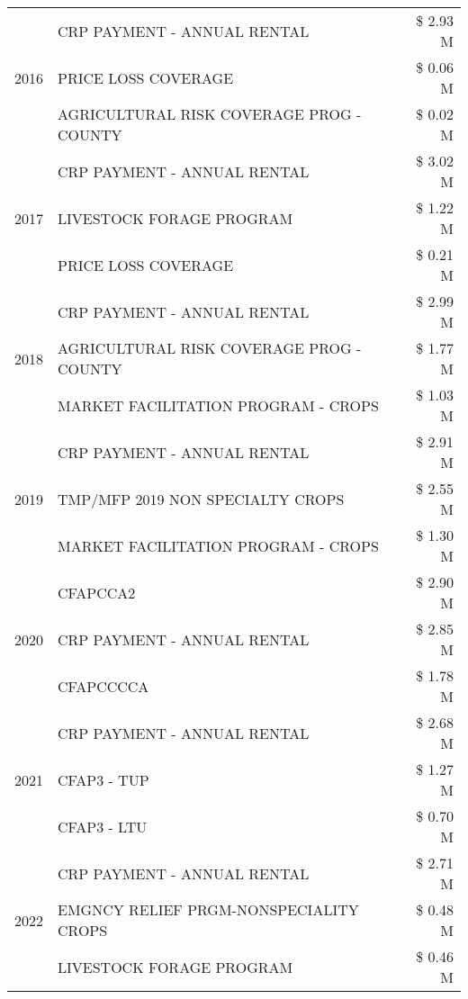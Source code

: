 \begin{tabular}{llr}
\cline{1-3}
\multirow[t]{3}{*}{2016} & CRP PAYMENT - ANNUAL RENTAL & \$ 2.93 M \\
 & PRICE LOSS COVERAGE & \$ 0.06 M \\
 & AGRICULTURAL RISK COVERAGE PROG - COUNTY & \$ 0.02 M \\
\cline{1-3}
\multirow[t]{3}{*}{2017} & CRP PAYMENT - ANNUAL RENTAL & \$ 3.02 M \\
 & LIVESTOCK FORAGE PROGRAM & \$ 1.22 M \\
 & PRICE LOSS COVERAGE & \$ 0.21 M \\
\cline{1-3}
\multirow[t]{3}{*}{2018} & CRP PAYMENT - ANNUAL RENTAL & \$ 2.99 M \\
 & AGRICULTURAL RISK COVERAGE PROG - COUNTY & \$ 1.77 M \\
 & MARKET FACILITATION PROGRAM - CROPS & \$ 1.03 M \\
\cline{1-3}
\multirow[t]{3}{*}{2019} & CRP PAYMENT - ANNUAL RENTAL & \$ 2.91 M \\
 & TMP/MFP 2019 NON SPECIALTY CROPS & \$ 2.55 M \\
 & MARKET FACILITATION PROGRAM - CROPS & \$ 1.30 M \\
\cline{1-3}
\multirow[t]{3}{*}{2020} & CFAPCCA2 & \$ 2.90 M \\
 & CRP PAYMENT - ANNUAL RENTAL & \$ 2.85 M \\
 & CFAPCCCCA & \$ 1.78 M \\
\cline{1-3}
\multirow[t]{3}{*}{2021} & CRP PAYMENT - ANNUAL RENTAL & \$ 2.68 M \\
 & CFAP3 - TUP & \$ 1.27 M \\
 & CFAP3 - LTU & \$ 0.70 M \\
\cline{1-3}
\multirow[t]{3}{*}{2022} & CRP PAYMENT - ANNUAL RENTAL & \$ 2.71 M \\
 & EMGNCY RELIEF PRGM-NONSPECIALITY CROPS & \$ 0.48 M \\
 & LIVESTOCK FORAGE PROGRAM & \$ 0.46 M \\
\cline{1-3}
\bottomrule
\end{tabular}
